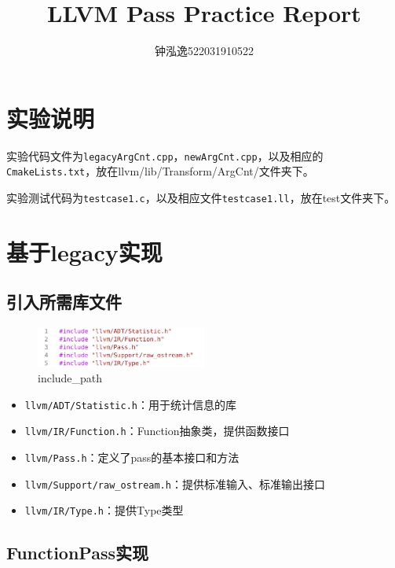 \documentclass[11pt, a4paper, oneside,UTF8]{ctexart}
\title{\textbf{LLVM Pass Practice Report}}
\author{钟泓逸522031910522}
\date{}%
\begin{document}
\setcounter{page}{1}

\maketitle
\vspace{-\baselineskip}
\thispagestyle{fancy}

\section{实验说明}
实验代码文件为\texttt{legacyArgCnt.cpp}，\texttt{newArgCnt.cpp}，以及相应的\texttt{CmakeLists.txt}，放在llvm/lib/Transform/ArgCnt/文件夹下。

实验测试代码为\texttt{testcase1.c}，以及相应文件\texttt{testcase1.ll}，放在test文件夹下。

\section{基于legacy实现}

\subsection{引入所需库文件}

\begin{figure}[h]
    \centering
    \includegraphics[width=0.5\textwidth]{./figure/legacy_1.png}
    \caption{include\_path}
    \label{figure:1.1}
\end{figure}

\begin{itemize}
    \setlength{\itemsep}{-1.0em}
    \item \texttt{llvm/ADT/Statistic.h}：用于统计信息的库
    \item \texttt{llvm/IR/Function.h}：Function抽象类，提供函数接口
    \item \texttt{llvm/Pass.h}：定义了pass的基本接口和方法
    \item \texttt{llvm/Support/raw\_ostream.h}：提供标准输入、标准输出接口
    \item \texttt{llvm/IR/Type.h}：提供Type类型
\end{itemize}

\subsection{FunctionPass实现}
\end{document}
